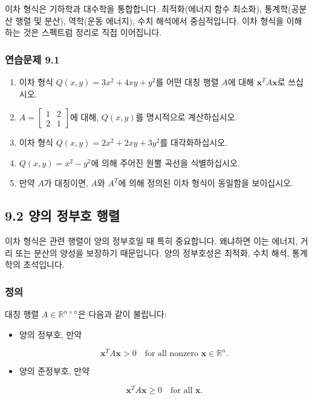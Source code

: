 \documentclass[
  12pt,
  a4paper,
]{article}
\begin{document}
이차 형식은 기하학과 대수학을 통합합니다. 최적화(에너지 함수 최소화), 통계학(공분산 행렬 및 분산), 역학(운동 에너지), 수치 해석에서 중심적입니다. 이차 형식을 이해하는 것은 스펙트럼 정리로 직접 이어집니다.

\subsubsection{연습문제 9.1}\label{exercises-91}

\begin{enumerate}
\def\labelenumi{\arabic{enumi}.}
\item
  이차 형식 \(Q(x,y) = 3x^2 + 4xy + y^2\)를 어떤 대칭 행렬 \(A\)에 대해 \(\mathbf{x}^T A \mathbf{x}\)로 쓰십시오.
\item
  \(A = \begin{bmatrix} 1 & 2 \\ 2 & 1 \end{bmatrix}\)에 대해, \(Q(x,y)\)를 명시적으로 계산하십시오.
\item
  이차 형식 \(Q(x,y) = 2x^2 + 2xy + 3y^2\)를 대각화하십시오.
\item
  \(Q(x,y) = x^2 - y^2\)에 의해 주어진 원뿔 곡선을 식별하십시오.
\item
  만약 \(A\)가 대칭이면, \(A\)와 \(A^T\)에 의해 정의된 이차 형식이 동일함을 보이십시오.
\end{enumerate}

\subsection{9.2 양의 정부호 행렬}\label{92-positive-definite-matrices}

이차 형식은 관련 행렬이 양의 정부호일 때 특히 중요합니다. 왜냐하면 이는 에너지, 거리 또는 분산의 양성을 보장하기 때문입니다. 양의 정부호성은 최적화, 수치 해석, 통계학의 초석입니다.

\subsubsection{정의}\label{definition-9}

대칭 행렬 \(A \in \mathbb{R}^{n \times n}\)은 다음과 같이 불립니다:

\begin{itemize}
\item
  양의 정부호, 만약

  \[\mathbf{x}^T A \mathbf{x} > 0 \quad \text{for all nonzero } \mathbf{x} \in \mathbb{R}^n.\]
\item
  양의 준정부호, 만약

  \[\mathbf{x}^T A \mathbf{x} \geq 0 \quad \text{for all } \mathbf{x}.\]
\end{itemize}
\end{document}
